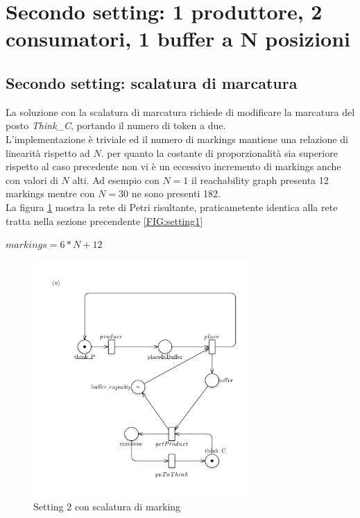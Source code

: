 \documentclass{article}
\begin{document}
\section{Secondo  setting: 1 produttore, 2 consumatori,  1 buffer a N posizioni}\label{SEC:secondo}
\subsection{Secondo  setting: scalatura di marcatura}\label{SEC:secondo-marking}
La soluzione con la scalatura di marcatura richiede di modificare la marcatura del posto \emph{Think\_C}, portando il numero di token a due.\\
L'implementazione è triviale ed il numero di markings mantiene una relazione di linearità rispetto ad $N$. per quanto la costante di proporzionalità sia superiore rispetto al caso precedente non vi è un eccessivo incremento di markings anche con valori di $N$ alti. Ad esempio con $N = 1$ il reachability graph presenta 12 markings mentre con $N = 30$ ne sono presenti 182.\\
La figura \ref{FIG:setting2_markdown} mostra la rete di Petri risultante, praticametente identica alla rete tratta nella sezione precendente \ref{FIG:setting1}\\\begin{center}$markings = 6*N + 12$\end{center}
\begin{figure}[!h]
\centering
\includegraphics[width=0.75\textwidth]{./Esercizio2_img/setting1.png}
\caption{Setting 2 con scalatura di marking} \label{FIG:setting2_markdown}
\end{figure}
\end{document}
